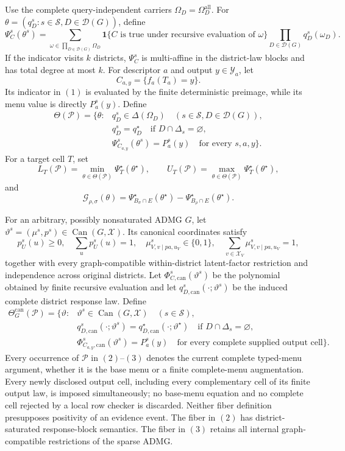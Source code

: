 Use the complete query-independent carriers \(\Omega_D=\Omega_D^{\mathrm{all}}\).  For \(\theta=(q_D^s:s\in\mathcal S,D\in\mathcal D(G))\), define
\[
\Psi_C^s(\theta^s)=
\sum_{\omega\in\prod_{D\in\mathcal D(G)}\Omega_D}
\mathbf 1\{C\text{ is true under recursive evaluation of }\omega\}
\prod_{D\in\mathcal D(G)}q_D^s(\omega_D).
\tag{1}
\]
If the indicator visits \(k\) districts, \(\Psi_C^s\) is multi-affine in the district-law blocks and has total degree at most \(k\).  For descriptor \(a\) and output \(y\in\mathcal Y_a\), let
\[
C_{a,y}=\{f_a(T_a)=y\}.
\]
Its indicator in \((1)\) is evaluated by the finite deterministic preimage, while its menu value is directly \(P_a^s(y)\).  Define
\[
\begin{split}
\Theta(\mathcal P)=\bigl\{\theta:{}&
q_D^s\in\Delta(\Omega_D)
\quad(s\in\mathcal S,D\in\mathcal D(G)),\\
&q_D^s=q_D^\star
\quad\text{if }D\cap\Delta_s=\varnothing,\\
&\Psi_{C_{a,y}}^s(\theta^s)=P_a^s(y)
\quad\text{for every }s,a,y\bigr\}.
\end{split}
\tag{2}
\]
For a target cell \(T\), set
\[
L_T(\mathcal P)=\min_{\theta\in\Theta(\mathcal P)}
\Psi_T^\star(\theta^\star),
\qquad
U_T(\mathcal P)=\max_{\theta\in\Theta(\mathcal P)}
\Psi_T^\star(\theta^\star),
\]
and
\[
\mathcal G_{\rho,\sigma}(\theta)=
\Psi_{B_\sigma\cap E}^\star(\theta^\star)
-\Psi_{B_\rho\cap E}^\star(\theta^\star).
\]

For an arbitrary, possibly nonsaturated ADMG \(G\), let \(\vartheta^s=(\mu^s,p^s)\in\operatorname{Can}(G,\mathcal X)\).  Its canonical coordinates satisfy
\[
p_U^s(u)\geq0,\quad\sum_up_U^s(u)=1,
\quad \mu_{V,v\mid pa,u_V}^s\in\{0,1\},
\quad \sum_{v\in\mathcal X_V}\mu_{V,v\mid pa,u_V}^s=1,
\]
together with every graph-compatible within-district latent-factor restriction and independence across original districts.  Let \(\Phi_{C,\mathrm{can}}^s(\vartheta^s)\) be the polynomial obtained by finite recursive evaluation and let \(q_{D,\mathrm{can}}^s(\cdot;\vartheta^s)\) be the induced complete district response law.  Define
\[
\begin{split}
\Theta_G^{\mathrm{can}}(\mathcal P)=\bigl\{\vartheta:{}&
\vartheta^s\in\operatorname{Can}(G,\mathcal X)
\quad(s\in\mathcal S),\\
&q_{D,\mathrm{can}}^s(\cdot;\vartheta^s)
=q_{D,\mathrm{can}}^\star(\cdot;\vartheta^\star)
\quad\text{if }D\cap\Delta_s=\varnothing,\\
&\Phi_{C_{a,y},\mathrm{can}}^s(\vartheta^s)=P_a^s(y)
\quad\text{for every complete supplied output cell}\bigr\}.
\end{split}
\tag{3}
\]
Every occurrence of \(\mathcal P\) in \((2)\)--\((3)\) denotes the current complete typed-menu argument, whether it is the base menu or a finite complete-menu augmentation.  Every newly disclosed output cell, including every complementary cell of its finite output law, is imposed simultaneously; no base-menu equation and no complete cell rejected by a local row checker is discarded.  Neither fiber definition presupposes positivity of an evidence event.  The fiber in \((2)\) has district-saturated response-block semantics.  The fiber in \((3)\) retains all internal graph-compatible restrictions of the sparse ADMG.